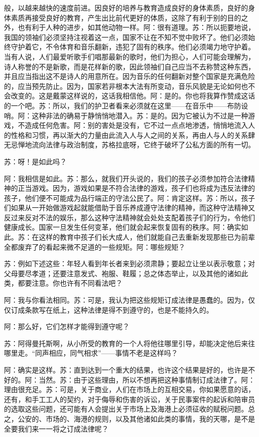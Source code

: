 \documentclass[11pt,oneside]{book}
\begin{document}
\begin{common-format}
    般，以越来越快的速度前进。因良好的培养与教育造成良好的身体素质，良好的身体素质再接受良好的教育，产生出比前代更好的体质，这除了有利于别的目的之外，也有利于人种的进步，如其他动物一样。阿：很有道理。苏：所以扼要地说，我国的领袖们必须坚持注视着这一点，国家不让在不知不觉中败坏了。他们必须始终守护着它，不令体育和音乐翻新，违犯了固有的秩序。他们必须竭力地守护着。当有人说，人们最爱听歌手们唱那最新的歌时，他们为担心，人们可能会理解为，诗人称誉的不是新歌，而是花样新的歌，因此领袖们自己应当不去称赞这种东西，并且应当指出这不是诗人的用意所在。因为音乐的任何翻新对整个国家是充满危险的，应当预先防止。因为，国家若非根本大法有所变动，音乐风貌是无论如何也不会改变的。这是戴蒙这样说的，这话我相信他。阿：是的。你也将我算作赞成这话的一个吧。苏：所以，我们的护卫者看来必须就在这里——在音乐中——布防设哨。阿：这种非法的确易于静悄悄地潜入。苏：是的。因为它被认为不过是一种游戏，不造成任何危害。阿：别的害处是没有，它不过一点点地渗透，悄悄地流入人的性格和习惯，再以渐大的力量由此流入人与人之间的关系，再由人与人的关系肆无忌惮地流向法律与政治制度，苏格拉底呀，它终于破坏了公私方面的所有一切。

    

    苏：呀！是如此吗？

    阿：我相信是如此。苏：那么，就我们开头说的，我们的孩子必须参加符合法律精神的正当游戏。因为，游戏如果是不符合法律的游戏，孩子们也将成为违反法律的孩子，他们便不可能成为品行端正的守法公民了。阿：肯定这样。苏：所以，孩子们如果从一开始做游戏起就能借助于音乐养成遵守法律的精神，而这种守法精神又反过来反对不法的娱乐，那么这种守法精神就会处处支配着孩子们的行为，令他们健康成长。国家一旦发生任何变革，他们就会起来恢复固有的秩序。阿：确实如此。苏：在这样的教育中孩子们长大成人，他们就能自己去重新发现那些已为前辈全都废弃了的看起来微不足道的一些规矩。阿：哪些规矩？

    苏：例如下述这些：年轻人看到年长者来到必须肃静；要起立让坐以表示敬意；对父母要尽孝道；还要注意发式、袍服、鞋履；总之体态举止，以及其他的诸如此类，都要注意。你也许有不同看法吧？

    阿：我与你看法相同。苏：可是，我认为把这些规矩订成法律是愚蠢的。因为，仅仅订成条款写在纸上，这种法律是得不到遵守的，也是不能持久的。



    阿：那么好，它们怎样才能得到遵守呢？

    苏：阿得曼托斯啊，从小所受的教育的一个人将他往哪里引导，却能决定他后来往哪里走。“同声相应，同气相求”——事情不老是这样吗？

    阿：确实是这样。苏：直到达到一个重大的结果，也许这个结果是好的，也许是不好的。阿：当然。苏：由于这些理由，所以不想再把这种事情制订成法律了。阿：理由很充足。苏：可是，关于商业，人们在市场上的互相交易，你如果愿意的话，还有，和手工工人的契约，对于侮辱和伤害的诉讼，关于民事案件的起诉和陪审员的选取这些问题，还可能有人会提出关于市场上及海港上必须征收的赋税问题。总之，公安的、市场的、海港的规则，以及其他诸如此类的事情，我的天哪，是不是全要我们来一一将之订成法律呢？


\end{common-format}
\end{document}
